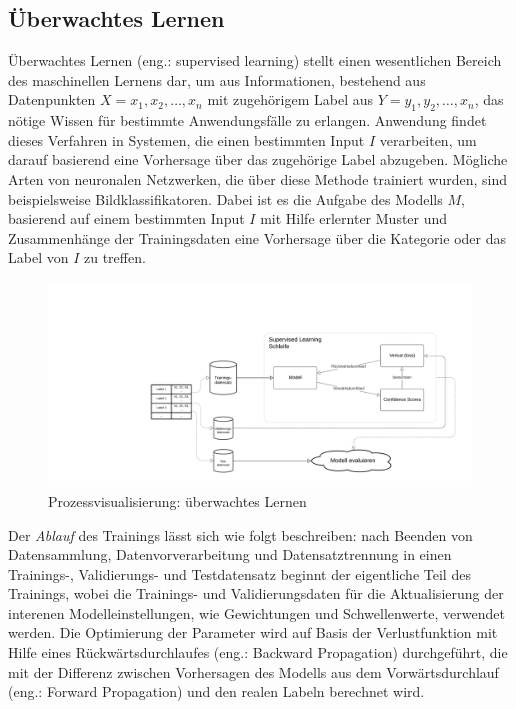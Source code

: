 \subsection{Überwachtes Lernen}\label{subsec:supervisedlearning}
Überwachtes Lernen (eng.: supervised learning) stellt einen wesentlichen Bereich des maschinellen Lernens dar, um aus Informationen, bestehend aus Datenpunkten \textit{$X = x_1, x_2, \ldots, x_n$} mit zugehörigem Label aus \textit{$Y = y_1, y_2, \ldots, x_n$}, das nötige Wissen für bestimmte Anwendungsfälle zu erlangen. Anwendung findet dieses Verfahren in Systemen, die einen bestimmten Input $I$ verarbeiten, um darauf basierend eine Vorhersage über das zugehörige Label abzugeben.
Mögliche Arten von neuronalen Netzwerken, die über diese Methode trainiert wurden, sind beispielsweise Bildklassifikatoren. Dabei ist es die Aufgabe des Modells $M$, basierend auf einem bestimmten Input $I$ mit Hilfe erlernter Muster und Zusammenhänge der Trainingsdaten eine Vorhersage über die Kategorie oder das Label von $I$ zu treffen.
\begin{figure}[H]
	\hspace{-30mm}
	\centering
	\includegraphics[width=\linewidth]{Bilder/SupervisedLearning.png}
	\caption{Prozessvisualisierung: überwachtes Lernen}
\end{figure}
Der \textit{Ablauf} des Trainings lässt sich wie folgt beschreiben: nach Beenden von Datensammlung, Datenvorverarbeitung und Datensatztrennung in einen Trainings-, Validierungs- und Testdatensatz beginnt der eigentliche Teil des Trainings, wobei die Trainings- und Validierungsdaten für die Aktualisierung der interenen Modelleinstellungen, wie Gewichtungen und Schwellenwerte, verwendet werden. Die Optimierung der Parameter wird auf Basis der Verlustfunktion mit Hilfe eines Rückwärtsdurchlaufes (eng.: Backward Propagation) durchgeführt, die mit der Differenz zwischen Vorhersagen des Modells aus dem Vorwärtsdurchlauf (eng.: Forward Propagation) und den realen Labeln berechnet wird.

